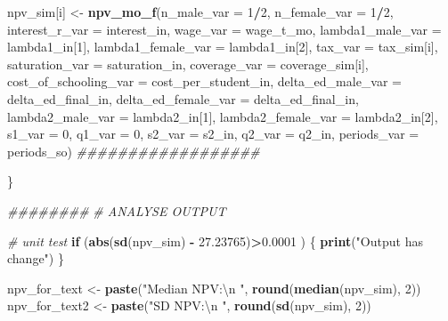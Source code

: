 \documentclass[]{article}
\newenvironment{Shaded}{\begin{snugshade}}{\end{snugshade}}
\newcommand{\CharTok}[1]{\textcolor[rgb]{0.31,0.60,0.02}{#1}}
\newcommand{\CommentTok}[1]{\textcolor[rgb]{0.56,0.35,0.01}{\textit{#1}}}
\newcommand{\ControlFlowTok}[1]{\textcolor[rgb]{0.13,0.29,0.53}{\textbf{#1}}}
\newcommand{\DataTypeTok}[1]{\textcolor[rgb]{0.13,0.29,0.53}{#1}}
\newcommand{\DecValTok}[1]{\textcolor[rgb]{0.00,0.00,0.81}{#1}}
\newcommand{\FloatTok}[1]{\textcolor[rgb]{0.00,0.00,0.81}{#1}}
\newcommand{\KeywordTok}[1]{\textcolor[rgb]{0.13,0.29,0.53}{\textbf{#1}}}
\newcommand{\NormalTok}[1]{#1}
\newcommand{\OperatorTok}[1]{\textcolor[rgb]{0.81,0.36,0.00}{\textbf{#1}}}
\newcommand{\StringTok}[1]{\textcolor[rgb]{0.31,0.60,0.02}{#1}}
\begin{document}
\begin{Shaded}
\begin{Highlighting}[]
{\NormalTok{npv_sim[i] <-}\StringTok{ }\KeywordTok{npv_mo_f}\NormalTok{(}\DataTypeTok{n_male_var =} \DecValTok{1}\OperatorTok{/}\DecValTok{2}\NormalTok{, }\DataTypeTok{n_female_var =} \DecValTok{1}\OperatorTok{/}\DecValTok{2}\NormalTok{, }
                \DataTypeTok{interest_r_var =}\NormalTok{ interest_in,}
                \DataTypeTok{wage_var =}\NormalTok{ wage_t_mo,}
                \DataTypeTok{lambda1_male_var =}\NormalTok{ lambda1_in[}\DecValTok{1}\NormalTok{],}
                \DataTypeTok{lambda1_female_var =}\NormalTok{ lambda1_in[}\DecValTok{2}\NormalTok{], }
                \DataTypeTok{tax_var =}\NormalTok{ tax_sim[i],}
                \DataTypeTok{saturation_var =}\NormalTok{ saturation_in,             }
                \DataTypeTok{coverage_var =}\NormalTok{ coverage_sim[i],}
                \DataTypeTok{cost_of_schooling_var =}\NormalTok{ cost_per_student_in,}
                \DataTypeTok{delta_ed_male_var =}\NormalTok{ delta_ed_final_in,}
                \DataTypeTok{delta_ed_female_var =}\NormalTok{ delta_ed_final_in, }
                \DataTypeTok{lambda2_male_var =}\NormalTok{ lambda2_in[}\DecValTok{1}\NormalTok{],}
                \DataTypeTok{lambda2_female_var =}\NormalTok{ lambda2_in[}\DecValTok{2}\NormalTok{],}
                \DataTypeTok{s1_var =} \DecValTok{0}\NormalTok{, }\DataTypeTok{q1_var =} \DecValTok{0}\NormalTok{, }\DataTypeTok{s2_var =}\NormalTok{ s2_in, }\DataTypeTok{q2_var =}\NormalTok{ q2_in,}
                \DataTypeTok{periods_var =}\NormalTok{ periods_so)}
\CommentTok{##################}

\NormalTok{\}}



\CommentTok{########}
\CommentTok{# ANALYSE OUTPUT}

\CommentTok{# unit test}
\ControlFlowTok{if}\NormalTok{ (}\KeywordTok{abs}\NormalTok{(}\KeywordTok{sd}\NormalTok{(npv_sim) }\OperatorTok{-}\StringTok{ }\FloatTok{27.23765}\NormalTok{)}\OperatorTok{>}\FloatTok{0.0001}\NormalTok{ ) \{}
  \KeywordTok{print}\NormalTok{(}\StringTok{"Output has change"}\NormalTok{)}
\NormalTok{\}}

\NormalTok{npv_for_text <-}\StringTok{ }\KeywordTok{paste}\NormalTok{(}\StringTok{"Median NPV:}\CharTok{\textbackslash{}n}\StringTok{ "}\NormalTok{, }\KeywordTok{round}\NormalTok{(}\KeywordTok{median}\NormalTok{(npv_sim), }\DecValTok{2}\NormalTok{))}
\NormalTok{npv_for_text2 <-}\StringTok{ }\KeywordTok{paste}\NormalTok{(}\StringTok{"SD NPV:}\CharTok{\textbackslash{}n}\StringTok{ "}\NormalTok{, }\KeywordTok{round}\NormalTok{(}\KeywordTok{sd}\NormalTok{(npv_sim), }\DecValTok{2}\NormalTok{))}

}
\end{Highlighting}
\end{Shaded}
\end{document}
